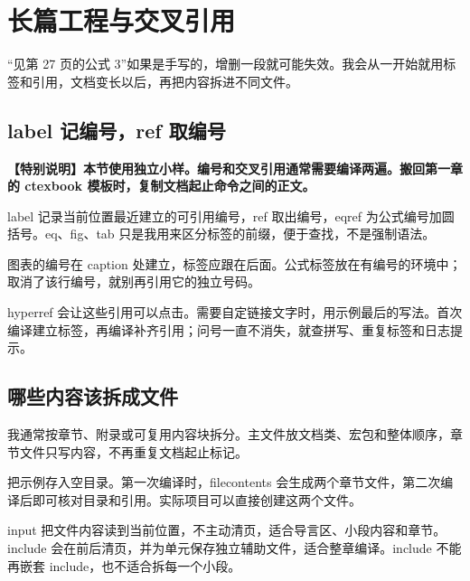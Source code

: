 \chapter{长篇工程与交叉引用}

“见第 27 页的公式 3”如果是手写的，增删一段就可能失效。我会从一开始就用标签和引用，文档变长以后，再把内容拆进不同文件。

\section{label 记编号，ref 取编号}

\begin{tcolorbox}[colback=Teal!4,colframe=Teal,boxrule=.7pt,arc=1mm,fontupper=\small\bfseries]\textbf{【特别说明】本节使用独立小样。编号和交叉引用通常需要编译两遍。搬回第一章的 ctexbook 模板时，复制文档起止命令之间的正文。}\end{tcolorbox}


label 记录当前位置最近建立的可引用编号，ref 取出编号，eqref 为公式编号加圆括号。eq、fig、tab 只是我用来区分标签的前缀，便于查找，不是强制语法。

图表的编号在 caption 处建立，标签应跟在后面。公式标签放在有编号的环境中；取消了该行编号，就别再引用它的独立号码。

hyperref 会让这些引用可以点击。需要自定链接文字时，用示例最后的写法。首次编译建立标签，再编译补齐引用；问号一直不消失，就查拼写、重复标签和日志提示。

\section{哪些内容该拆成文件}

我通常按章节、附录或可复用内容块拆分。主文件放文档类、宏包和整体顺序，章节文件只写内容，不再重复文档起止标记。

把示例存入空目录。第一次编译时，filecontents 会生成两个章节文件，第二次编译后即可核对目录和引用。实际项目可以直接创建这两个文件。


input 把文件内容读到当前位置，不主动清页，适合导言区、小段内容和章节。include 会在前后清页，并为单元保存独立辅助文件，适合整章编译。include 不能再嵌套 include，也不适合拆每一个小段。

